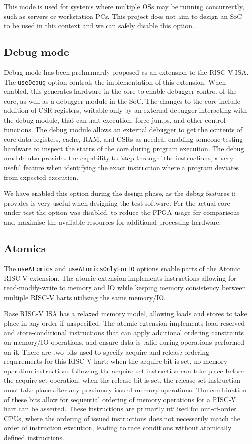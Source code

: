This mode is used for systems where multiple OSs may be running concurrently, such as servers or workstation PCs. This project does not aim to design an SoC to be used in this context and we can safely disable this option.

\subsection{Debug mode}
Debug mode has been preliminarily proposed as an extension to the RISC-V ISA. The \texttt{useDebug} option controls the implementation of this extension. When enabled, this generates hardware in the core to enable debugger control of the core, as well as a debugger module in the SoC. The changes to the core include addition of CSR registers, writable only by an external debugger interacting with the debug module, that can halt execution, force jumps, and other control functions. The debug module allows an external debugger to get the contents of core data registers, cache, RAM, and CSRs as needed, enabling someone testing hardware to inspect the status of the core during program execution. The debug module also provides the capability to 'step through' the instructions, a very useful feature when identifying the exact instruction where a program deviates from expected execution.

We have enabled this option during the design phase, as the debug features it provides is very useful when designing the test software. For the actual core under test the option was disabled, to reduce the FPGA usage for comparisons and maximise the available resources for additional processing hardware.

\subsection{Atomics}
The \texttt{useAtomics} and \texttt{useAtomicsOnlyForIO} options enable parts of the Atomic RISC-V extension. The atomic extension implements instructions allowing for read-modify-write to memory and IO while keeping memory consistency between multiple RISC-V harts utilising the same memory/IO.

Base RISC-V ISA has a relaxed memory model, allowing loads and stores to take place in any order if unspecified. The atomic extension implements load-reserved and store-conditional instructions that can apply additional ordering constraints on memory/IO operations, and ensure data is valid during operations performed on it. There are two bits used to specify acquire and release ordering requirements for this RISC-V hart: when the acquire bit is set, no memory operation instructions following the acquire-set instruction can take place before the acquire-set operation; when the release bit is set, the release-set instruction must take place after any previously issued memory operations. The combination of these bits allow for sequential ordering of memory operations for a RISC-V hart can be asserted. These instructions are primarily utilised for out-of-order CPUs, where the ordering of issued instructions does not necessarily match the order of instruction execution, leading to race conditions without atomically defined instructions.

